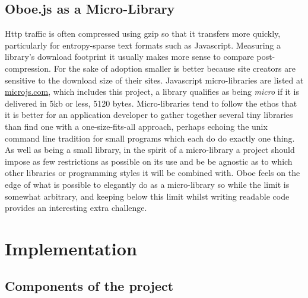\documentclass[]{article}
\let\stdsection\section
\renewcommand\section{\newpage\stdsection}
\begin{document}
\subsection{Oboe.js as a Micro-Library}

Http traffic is often compressed using gzip so that it transfers more
quickly, particularly for entropy-sparse text formats such as
Javascript. Measuring a library's download footprint it usually makes
more sense to compare post-compression. For the sake of adoption smaller
is better because site creators are sensitive to the download size of
their sites. Javascript micro-libraries are listed at
\href{http://microjs.com}{microjs.com}, which includes this project, a
library qualifies as being \emph{micro} if it is delivered in 5kb or
less, 5120 bytes. Micro-libraries tend to follow the ethos that it is
better for an application developer to gather together several tiny
libraries than find one with a one-size-fits-all approach, perhaps
echoing the unix command line tradition for small programs which each do
do exactly one thing. As well as being a small library, in the spirit of
a micro-library a project should impose as few restrictions as possible
on its use and be be agnostic as to which other libraries or programming
styles it will be combined with. Oboe feels on the edge of what is
possible to elegantly do as a micro-library so while the limit is
somewhat arbitrary, and keeping below this limit whilst writing readable
code provides an interesting extra challenge.

\section{Implementation}

\subsection{Components of the project}
\end{document}

